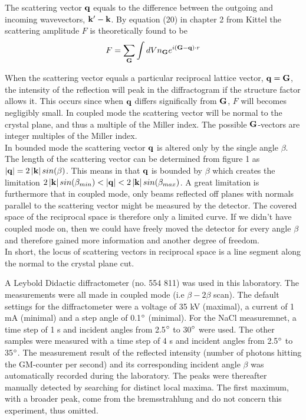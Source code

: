 \documentclass[a4paper,twoside=false,abstract=false,numbers=noenddot,
titlepage=false,headings=small,parskip=half,version=last]{scrartcl}
\begin{document}
The scattering vector $\bold{q}$ equals to the difference between the outgoing and incoming wavevectors,
$\bold{k}' - \bold{k}$. By equation (20) in chapter 2 from Kittel \cite{Kittel} the scattering
amplitude $F$ is theoretically found to be
\begin{equation}
    \label{eq:scatamp}
    F = \sum_\bold{G} \int dV n_{\bold{G}} e^{i(\bold{G}-\bold{q})\cdot r}
\end{equation}

When the scattering vector equals a particular reciprocal lattice vector, $\bold{q} = \bold{G}$, the intensity of the reflection will peak in the diffractogram if the structure factor allows it.
This occurs since when $\bold{q}$ differs significally from $\bold{G}$, $F$ will becomes negligibly small.
In coupled mode the scattering vector will be normal to the crystal plane, and thus a multiple of the Miller index. 
The possible $\bold{G}$-vectors are integer multiples of the Miller index.\\


In bounded mode the scattering vector $\bold{q}$ is altered only by the single angle $\beta$.
The length of the scattering vector can be determined from figure 1 as $\left\vert \bold{q} \right\vert = 2 \left\vert \bold{k} \right\vert sin(\beta)$.
This means in that $\bold{q}$ is bounded by $\beta$ which creates the limitation $2 \left\vert \bold{k} \right\vert sin(\beta_{min}) < \left\vert \bold{q} \right\vert < 2 \left\vert \bold{k} \right\vert sin(\beta_{max})$.
A great limitation is furthermore that in coupled mode, only beams reflected off planes with normals parallel to the scattering vector might be measured by the detector. The covered space of the reciprocal space is therefore only a limited curve.
If we didn't have coupled mode on, then we could have freely moved the detector for every angle $\beta$ and therefore gained more information and another degree of freedom.\\
In short, the locus of scattering vectors in reciprocal space is a line segment along the normal to the crystal plane cut.


A Leybold Didactic diffractometer (no. 554 811) was used in this laboratory.
The measurements were all made in coupled mode (i.e $\beta-2\beta$ scan).
The default settings for the diffractometer were a voltage of 35 kV (maximal), a current of 1 mA (minimal) and a step angle of 0.1$\degree$ (minimal).
For the NaCl measuremnet, a time step of 1 s and incident angles from 2.5$\degree$ to 30$\degree$ were used.
The other samples were measured with a time step of 4 s and incident angles from 2.5$\degree$ to 35$\degree$.
The measurement result of the reflected intensity (number of photons hitting the GM-counter per second) and its corresponding incident angle $\beta$ was automatically recorded during the laboratory.
The peaks were thereafter manually detected by searching for distinct local maxima. The first maximum, with a broader peak, come from the bremsstrahlung and do not concern this experiment, thus omitted.
\end{document}
